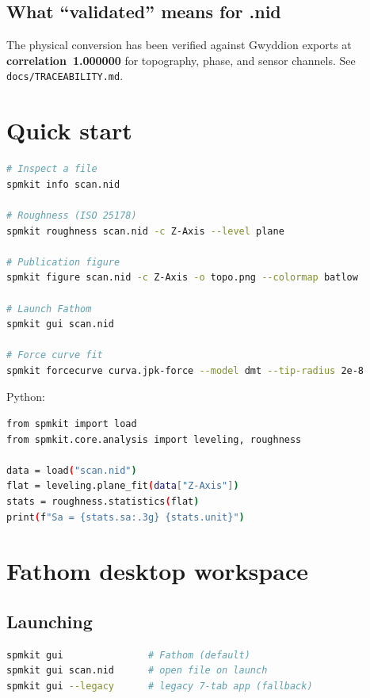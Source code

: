 \documentclass[a4paper,11pt]{article}
\begin{document}
\subsection{What ``validated'' means for .nid}
The physical conversion has been verified against Gwyddion exports at
\textbf{correlation~1.000000} for topography, phase, and sensor channels. See
\texttt{docs/TRACEABILITY.md}.

\section{Quick start}

\begin{lstlisting}[language=bash]
# Inspect a file
spmkit info scan.nid

# Roughness (ISO 25178)
spmkit roughness scan.nid -c Z-Axis --level plane

# Publication figure
spmkit figure scan.nid -c Z-Axis -o topo.png --colormap batlow

# Launch Fathom
spmkit gui scan.nid

# Force curve fit
spmkit forcecurve curva.jpk-force --model dmt --tip-radius 2e-8
\end{lstlisting}

Python:

\begin{lstlisting}[language=bash]
from spmkit import load
from spmkit.core.analysis import leveling, roughness

data = load("scan.nid")
flat = leveling.plane_fit(data["Z-Axis"])
stats = roughness.statistics(flat)
print(f"Sa = {stats.sa:.3g} {stats.unit}")
\end{lstlisting}

\section{Fathom desktop workspace}

\subsection{Launching}
\begin{lstlisting}[language=bash]
spmkit gui               # Fathom (default)
spmkit gui scan.nid      # open file on launch
spmkit gui --legacy      # legacy 7-tab app (fallback)
\end{lstlisting}
\end{document}
